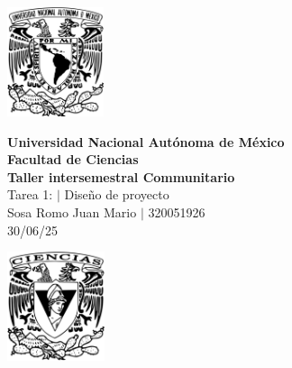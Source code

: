 \begin{center}
    \begin{minipage}{3cm}
    	\begin{center}
    		\includegraphics[height=3.2cm]{src/Img/Logo_UNAM.png}
    	\end{center}
    \end{minipage}\hfill
    \begin{minipage}{10cm}
    	\begin{center}
    	\textbf{\large Universidad Nacional Autónoma de México}\\[0.1cm]
        \textbf{Facultad de Ciencias}\\[0.1cm]
        \textbf{Taller intersemestral Communitario}\\[0.1cm]
        Tarea 1: $|$ Diseño de proyecto \\[0.1cm]
        Sosa Romo Juan Mario $|$ 320051926 \\[0.1cm]
        30/06/25
    	\end{center}
    \end{minipage}\hfill
    \begin{minipage}{3cm}
    	\begin{center}
    		\includegraphics[height=3.2cm]{src/Img/Logo_FC.png}
    	\end{center}
    \end{minipage}
\end{center}

